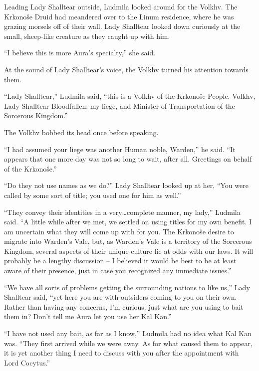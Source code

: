 Leading Lady Shalltear outside, Ludmila looked around for the Volkhv. The Krkonoše Druid had meandered over to the Linum residence, where he was grazing morsels off of their wall. Lady Shalltear looked down curiously at the small, sheep-like creature as they caught up with him.

 

“I believe this is more Aura’s specialty,” she said.

 

At the sound of Lady Shalltear’s voice, the Volkhv turned his attention towards them.

 

“Lady Shalltear,” Ludmila said, “this is a Volkhv of the Krkonoše People. Volkhv, Lady Shalltear Bloodfallen: my liege, and Minister of Transportation of the Sorcerous Kingdom.”

 

The Volkhv bobbed its head once before speaking.

 

“I had assumed your liege was another Human noble, Warden,” he said. “It appears that one more day was not so long to wait, after all. Greetings on behalf of the Krkonoše.”

 

“Do they not use names as we do?” Lady Shalltear looked up at her, “You were called by some sort of title; you used one for him as well.”

 

“They convey their identities in a very…complete manner, my lady,” Ludmila said. “A little while after we met, we settled on using titles for my own benefit. I am uncertain what they will come up with for you. The Krkonoše desire to migrate into Warden’s Vale, but, as Warden’s Vale is a territory of the Sorcerous Kingdom, several aspects of their unique culture lie at odds with our laws. It will probably be a lengthy discussion – I believed it would be best to be at least aware of their presence, just in case you recognized any immediate issues.”

 

“We have all sorts of problems getting the surrounding nations to like us,” Lady Shalltear said, “yet here you are with outsiders coming to you on their own. Rather than having any concerns, I’m curious: just what are you using to bait them in? Don’t tell me Aura let you use her Kal Kan.”

 

“I have not used any bait, as far as I know,” Ludmila had no idea what Kal Kan was. “They first arrived while we were away. As for what caused them to appear, it is yet another thing I need to discuss with you after the appointment with Lord Cocytus.”

